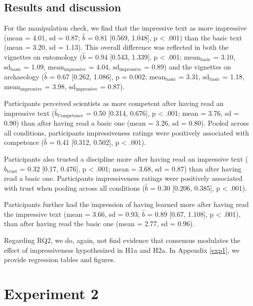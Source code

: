\documentclass[
  doc,floatsintext]{apa6}
\begin{document}
\subsection{Results and discussion}\label{results-and-discussion}

For the manipulation check, we find that the impressive text as more impressive (mean = 4.01, sd = 0.87; \(\hat{b}\) = 0.81 {[}0.569, 1.048{]}, p \textless{} .001) than the basic text (mean = 3.20, sd = 1.13). This overall difference was reflected in both the vignettes on entomology (\(\hat{b}\) = 0.94 {[}0.543, 1.339{]}, p \textless{} .001; \(\text{mean}_{\text{basic}}\) = 3.10, \(\text{sd}_{\text{basic}}\) = 1.09, \(\text{mean}_{\text{impressive}}\) = 4.04, \(\text{sd}_{\text{impressive}}\) = 0.89) and the vignettes on archaeology (\(\hat{b}\) = 0.67 {[}0.262, 1.086{]}, p = 0.002; \(\text{mean}_{\text{basic}}\) = 3.31, \(\text{sd}_{\text{basic}}\) = 1.18, \(\text{mean}_{\text{impressive}}\) = 3.98, \(\text{sd}_{\text{impressive}}\) = 0.87).

Participants perceived scientists as more competent after having read an impressive text (\(\hat{b}_{\text{Competence}}\) = 0.50 {[}0.314, 0.676{]}, p \textless{} .001; mean = 3.76, sd = 0.90) than after having read a basic one (mean = 3.26, sd = 0.80). Pooled across all conditions, participants impressiveness ratings were positively associated with competence (\(\hat{b}\) = 0.41 {[}0.312, 0.502{]}, p \textless{} .001).

Participants also trusted a discipline more after having read an impressive text (\(\hat{b}_{\text{trust}}\) = 0.32 {[}0.17, 0.476{]}, p \textless{} .001; mean = 3.68, sd = 0.87) than after having read a basic one. Participants impressiveness ratings were positively associated with trust when pooling across all conditions (\(\hat{b}\) = 0.30 {[}0.206, 0.385{]}, p \textless{} .001).

Participants further had the impression of having learned more after having read the impressive text (mean = 3.66, sd = 0.93; \(\hat{b}\) = 0.89 {[}0.67, 1.108{]}, p \textless{} .001), than after having read the basic one (mean = 2.77, sd = 0.96).

Regarding RQ2, we do, again, not find evidence that consensus modulates the effect of impressiveness hypothesized in H1a and H2a. In Appendix \ref{exp1}, we provide regression tables and figures.

\section{Experiment 2}\label{experiment-2}
\end{document}
